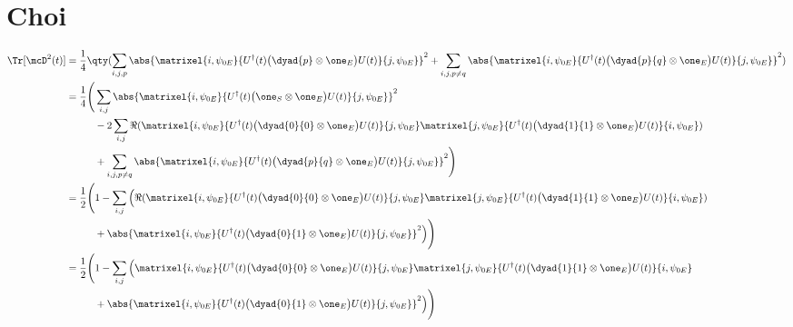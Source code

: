 \section{Choi}
\begin{align}
\label{eq:appendix:A:1}
\Tr[\mcD^2(t)] &= 
\frac{1}{4}
\qty(
\sum_{i,j,p}
\abs{\matrixel{i, \psi_{0E}}
{U^\dagger(t) \big(\dyad{p} \otimes \one_E\big) U(t)}
{j, \psi_{0E}}
}^2 +
\sum_{i,j,p\ne q}
\abs{\matrixel{i, \psi_{0E}}
{U^\dagger(t) \big(\dyad{p}{q} \otimes \one_E\big) U(t)}
{j, \psi_{0E}}
}^2
) \\
\label{eq:appendix:A:2}
&= 
\frac{1}{4}
\Bigg(
\sum_{i,j}
\abs{\matrixel{i, \psi_{0E}}
{U^\dagger(t) \big(\one_S \otimes \one_E\big) U(t)}
{j, \psi_{0E}}
}^2 
\nonumber \\
&\hspace*{10mm}
- 2 \sum_{i,j}
\Re(
\matrixel{i, \psi_{0E}}
{U^\dagger(t) \big(\dyad{0}{0} \otimes \one_E\big) U(t)}
{j, \psi_{0E}}
\matrixel{j, \psi_{0E}}
{U^\dagger(t) \big(\dyad{1}{1} \otimes \one_E\big) U(t)}
{i, \psi_{0E}}
)
\nonumber \\
& \hspace*{10mm}
+ \sum_{i,j,p\ne q}
\abs{\matrixel{i, \psi_{0E}}
{U^\dagger(t) \big(\dyad{p}{q} \otimes \one_E\big) U(t)}
{j, \psi_{0E}}
}^2
\Bigg) \\
\label{eq:appendix:A:3}
&= 
\frac{1}{2} 
\Bigg(
1 - 
\sum_{i,j}
\Big( \Re(
\matrixel{i, \psi_{0E}}
{U^\dagger(t) \big(\dyad{0}{0} \otimes \one_E\big) U(t)}
{j, \psi_{0E}}
\matrixel{j, \psi_{0E}}
{U^\dagger(t) \big(\dyad{1}{1} \otimes \one_E\big) U(t)}
{i, \psi_{0E}}
)
\nonumber \\
& \hspace*{10mm}
+
\abs{\matrixel{i, \psi_{0E}}
{U^\dagger(t) \big(\dyad{0}{1} \otimes \one_E\big) U(t)}
{j, \psi_{0E}}
}^2
\Big)
\Bigg) \\
\label{eq:appendix:A:4}
&= 
\frac{1}{2} 
\Bigg(
1 - 
\sum_{i,j}
\Big(
\matrixel{i, \psi_{0E}}
{U^\dagger(t) \big(\dyad{0}{0} \otimes \one_E\big) U(t)}
{j, \psi_{0E}}
\matrixel{j, \psi_{0E}}
{U^\dagger(t) \big(\dyad{1}{1} \otimes \one_E\big) U(t)}
{i, \psi_{0E}}
\nonumber \\
& \hspace*{10mm}
+
\abs{\matrixel{i, \psi_{0E}}
{U^\dagger(t) \big(\dyad{0}{1} \otimes \one_E\big) U(t)}
{j, \psi_{0E}}
}^2
\Big)
\Bigg)
\end{align}
